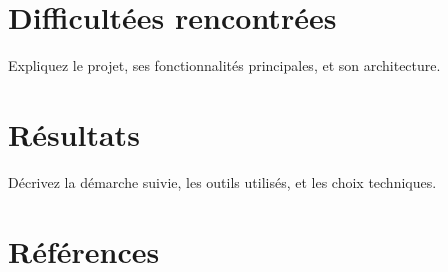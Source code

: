 \documentclass[a4paper,12pt]{article}
\begin{document}
\section{Difficultées rencontrées}
Expliquez le projet, ses fonctionnalités principales, et son architecture.

\section{Résultats}
Décrivez la démarche suivie, les outils utilisés, et les choix techniques.

\section*{Références}
\nocite{*}
\printbibliography
% 
% 
\end{document}
